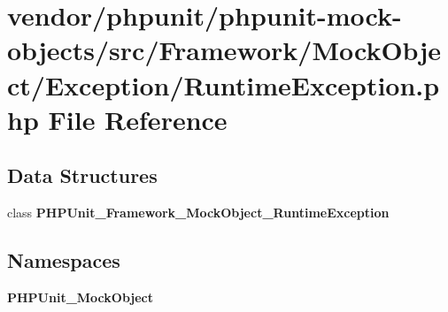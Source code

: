 \section{vendor/phpunit/phpunit-\/mock-\/objects/src/\+Framework/\+Mock\+Object/\+Exception/\+Runtime\+Exception.php File Reference}
\label{phpunit_2phpunit-mock-objects_2src_2_framework_2_mock_object_2_exception_2_runtime_exception_8php}
\subsection*{Data Structures}
\begin{DoxyCompactItemize}
\item 
class {\bf P\+H\+P\+Unit\+\_\+\+Framework\+\_\+\+Mock\+Object\+\_\+\+Runtime\+Exception}
\end{DoxyCompactItemize}
\subsection*{Namespaces}
\begin{DoxyCompactItemize}
\item 
 {\bf P\+H\+P\+Unit\+\_\+\+Mock\+Object}
\end{DoxyCompactItemize}
